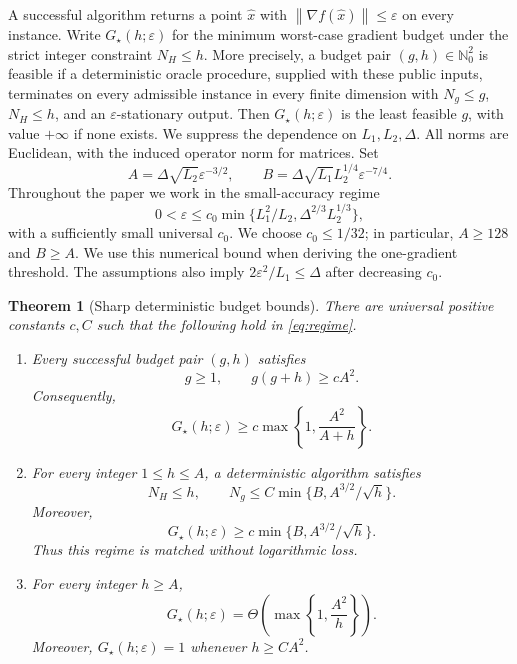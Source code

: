 \documentclass[11pt]{article}
\newtheorem{theorem}{Theorem}[section]
\theoremstyle{remark}
\theoremstyle{remark}
\newcommand{\eps}{\varepsilon}
\newcommand{\norm}[1]{\left\lVert#1\right\rVert}
\newcommand{\G}{G_\star}
\begin{document}
A successful algorithm returns a point $\hat x$ with $\norm{\nabla f(\hat x)}\le\eps$ on every instance. Write $\G(h;\eps)$ for the minimum worst-case gradient budget under the strict integer constraint $N_H\le h$. More precisely, a budget pair $(g,h)\in\mathbb N_0^2$ is feasible if a deterministic oracle procedure, supplied with these public inputs, terminates on every admissible instance in every finite dimension with $N_g\le g$, $N_H\le h$, and an $\eps$-stationary output. Then $\G(h;\eps)$ is the least feasible $g$, with value $+\infty$ if none exists. We suppress the dependence on $L_1,L_2,\Delta$. All norms are Euclidean, with the induced operator norm for matrices. Set
\begin{equation}\label{eq:AB}
 A=\Delta\sqrt{L_2}\eps^{-3/2},\qquad
 B=\Delta\sqrt{L_1}L_2^{1/4}\eps^{-7/4}.
\end{equation}
Throughout the paper we work in the small-accuracy regime
\begin{equation}\label{eq:regime}
 0<\eps\le c_0\min\{L_1^2/L_2,\Delta^{2/3}L_2^{1/3}\},
\end{equation}
with a sufficiently small universal $c_0$. We choose $c_0\le1/32$; in particular, $A\ge128$ and $B\ge A$. We use this numerical bound when deriving the one-gradient threshold. The assumptions also imply $2\eps^2/L_1\le\Delta$ after decreasing $c_0$.

\begin{theorem}[Sharp deterministic budget bounds]\label{thm:main}
There are universal positive constants $c,C$ such that the following hold in \eqref{eq:regime}.
\begin{enumerate}
\item Every successful budget pair $(g,h)$ satisfies
\begin{equation}\label{eq:product}
 g\ge1,\qquad g(g+h)\ge cA^2.
\end{equation}
Consequently,
\begin{equation}\label{eq:global-lower}
 \G(h;\eps)\ge c\max\left\{1,\frac{A^2}{A+h}\right\}.
\end{equation}
\item For every integer $1\le h\le A$, a deterministic algorithm satisfies
\begin{equation}\label{eq:strict-upper}
 N_H\le h,\qquad N_g\le C\min\{B,A^{3/2}/\sqrt h\}.
\end{equation}
Moreover,
\[
 \G(h;\eps)\ge c\min\{B,A^{3/2}/\sqrt h\}.
\]
Thus this regime is matched without logarithmic loss.
\item For every integer $h\ge A$,
\begin{equation}\label{eq:rich-matching}
 \G(h;\eps)=\Theta\left(\max\left\{1,\frac{A^2}{h}\right\}\right).
\end{equation}
Moreover, $\G(h;\eps)=1$ whenever $h\ge CA^2$.
\end{enumerate}
\end{theorem}
\end{document}
